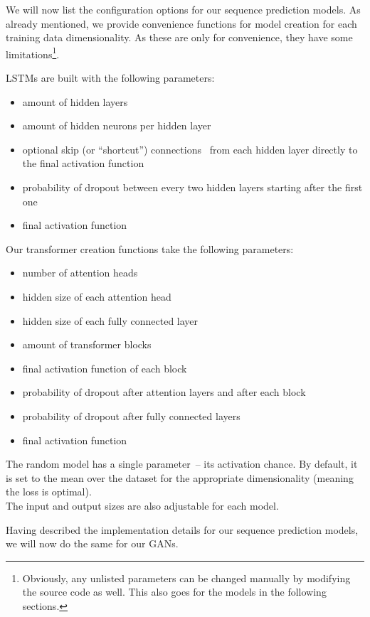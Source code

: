 We will now list the configuration options for our sequence prediction
models. As already mentioned, we provide convenience functions for
model creation for each training data dimensionality. As these are
only for convenience, they have some limitations\footnote{Obviously,
  any unlisted parameters can be changed manually by modifying the
  source code as well. This also goes for the models in the following
  sections.}.

LSTMs are built with the following parameters:
\begin{itemize}
\item amount of hidden layers
\item amount of hidden neurons per hidden layer
\item optional skip (or ``shortcut'')
  connections~\cite{heDeepResidualLearning2015} from each hidden layer
  directly to the final activation function
\item probability of dropout between every two hidden layers starting
  after the first one
\item final activation function
\end{itemize}
Our transformer creation functions take the following parameters:
\begin{itemize}
\item number of attention heads
\item hidden size of each attention head
\item hidden size of each fully connected layer
\item amount of transformer blocks
\item final activation function of each block
\item probability of dropout after attention layers and after each
  block
\item probability of dropout after fully connected layers
\item final activation function
\end{itemize}
The random model has a single parameter~-- its activation chance. By
default, it is set to the mean over the dataset for the appropriate
dimensionality (meaning the loss is optimal). \\
The input and output sizes are also adjustable for each model.

Having described the implementation details for our sequence
prediction models, we will now do the same for our GANs.


